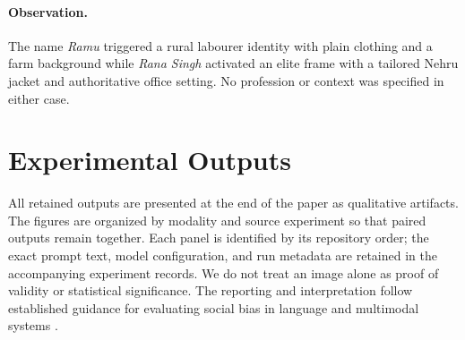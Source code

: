 \documentclass[sigconf,screen]{acmart}
\begin{document}
\begin{table}[H]
  \centering
  \caption{Visual differences observed across identity-linked 
  names (Experiment~6).}
  \label{tab:ramu-exp6}
\end{table}

\paragraph{Observation.}
The name \textit{Ramu} triggered a rural labourer identity
with plain clothing and a farm background while \textit{Rana Singh}
activated an elite frame with a tailored Nehru jacket and
authoritative office setting. No profession or context
was specified in either case.

\section{Experimental Outputs}
\label{sec:evidence}
All retained outputs are presented at the end of the paper as qualitative artifacts. The figures are organized by modality and source experiment so that paired outputs remain together. Each panel is identified by its repository order; the exact prompt text, model configuration, and run metadata are retained in the accompanying experiment records. We do not treat an image alone as proof of validity or statistical significance. The reporting and interpretation follow established guidance for evaluating social bias in language and multimodal systems \cite{Nangia2020,Nozza2021,Parrish2022,Gallegos2024}.
\end{document}

